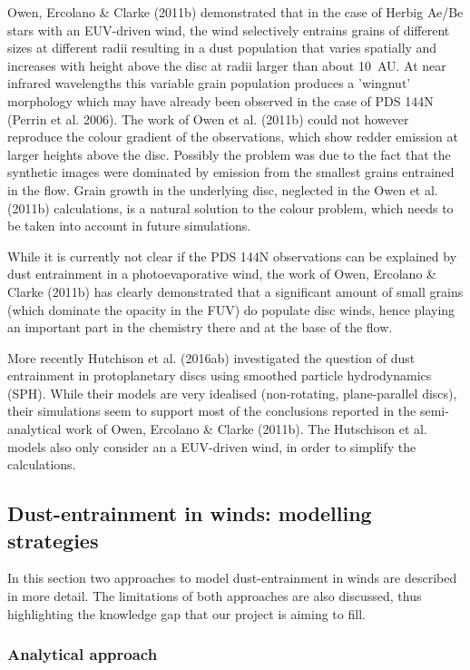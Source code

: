 \documentclass[10pt,fleqn,twoside]{article}
\begin{document}
Owen, Ercolano \& Clarke (2011b) demonstrated that in the case of
Herbig Ae/Be stars with an EUV-driven wind, the wind selectively entrains
grains of different sizes at different radii resulting in a dust
population that varies spatially and increases with height above the
disc at radii larger than about 10~AU. At near infrared wavelengths
this variable grain population produces a 'wingnut' morphology which
may have already been observed in the case of PDS 144N (Perrin et al.
2006). The work of Owen et al. (2011b) could not however reproduce the
colour gradient of the observations, which show redder emission at
larger heights above the disc. Possibly the problem was due to the
fact that the synthetic images were dominated by emission from the
smallest grains entrained in the flow. Grain growth in the underlying
disc, neglected in the
Owen et al. (2011b) calculations, is a natural solution to
the colour problem, which needs to be taken into account in future
simulations. 

While it is currently not clear if the PDS 144N observations can be
explained by dust entrainment in a photoevaporative wind, the work of
Owen, Ercolano \& Clarke (2011b) has clearly demonstrated that a
significant amount of small grains (which dominate the opacity in the
FUV) do populate disc winds, hence playing an important part in the
chemistry there and at the base of the flow. 

More recently Hutchison et al. (2016ab) investigated the question of
dust entrainment in protoplanetary discs using smoothed particle
hydrodynamics (SPH). While their models are very idealised (non-rotating,
plane-parallel discs), their simulations seem to support most of the
conclusions reported in the semi-analytical work of Owen, Ercolano \&
Clarke (2011b). The Hutschison et al.  models also only consider an a
EUV-driven wind, in order to simplify the calculations.  

\subsection{Dust-entrainment in winds: modelling strategies}

In this section two approaches to model dust-entrainment in
winds are described in more detail. The limitations of both approaches
are also discussed, thus highlighting the knowledge gap that our
project is aiming to fill. 

\subsubsection{Analytical approach}\label{sec:analytical_approach}
\end{document}
